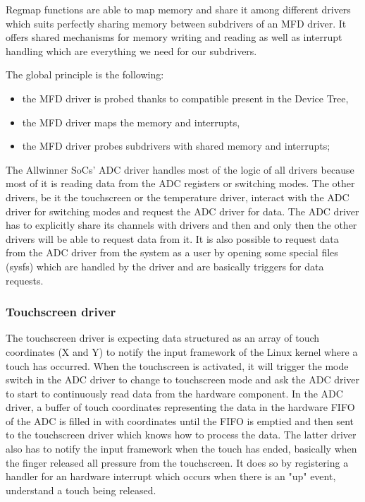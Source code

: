 Regmap functions are able to map memory and share it among different drivers which suits perfectly sharing memory between subdrivers of an MFD driver. It offers shared mechanisms for memory writing and reading as well as interrupt handling which are everything we need for our subdrivers.

The global principle is the following:

\begin{itemize}
  \item the MFD driver is probed thanks to compatible present in the Device Tree,
  \item the MFD driver maps the memory and interrupts,
  \item the MFD driver probes subdrivers with shared memory and interrupts;
\end{itemize}

The Allwinner SoCs' ADC driver handles most of the logic of all drivers because most of it is reading data from the ADC registers or switching modes. The other drivers, be it the touchscreen or the temperature driver, interact with the ADC driver for switching modes and request the ADC driver for data. The ADC driver has to explicitly share its channels with drivers and then and only then the other drivers will be able to request data from it. It is also possible to request data from the ADC driver from the system as a user by opening some special files (sysfs) which are handled by the driver and are basically triggers for data requests.

\subsubsection{Touchscreen driver}

The touchscreen driver is expecting data structured as an array of touch coordinates (X and Y) to notify the input framework of the Linux kernel where a touch has occurred. When the touchscreen is activated, it will trigger the mode switch in the ADC driver to change to touchscreen mode and ask the ADC driver to start to continuously read data from the hardware component. In the ADC driver, a buffer of touch coordinates representing the data in the hardware FIFO of the ADC is filled in with coordinates until the FIFO is emptied and then sent to the touchscreen driver which knows how to process the data. The latter driver also has to notify the input framework when the touch has ended, basically when the finger released all pressure from the touchscreen. It does so by registering a handler for an hardware interrupt which occurs when there is an "up" event, understand a touch being released.

